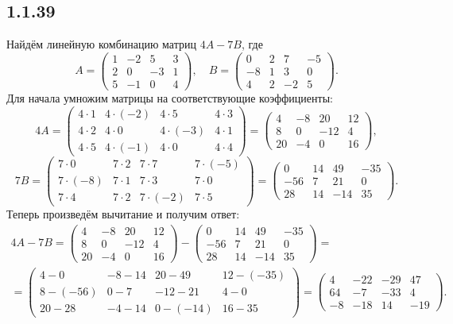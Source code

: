 \subsection{1.1.39}

Найдём линейную комбинацию матриц $4A-7B$, где
\[
A=
\begin{pmatrix}
	1 & -2 & 5 & 3 \\
	2 & 0 & -3 & 1 \\
	5 & -1 & 0 & 4
\end{pmatrix}
,\quad B=
\begin{pmatrix}
	0 & 2 & 7 & -5 \\
	-8 & 1 & 3 & 0 \\
	4 & 2 & -2 & 5
\end{pmatrix}
.
\]
Для начала умножим матрицы на соответствующие коэффициенты:
\[
4A=
\begin{pmatrix}
	4\cdot1 & 4\cdot(-2) & 4\cdot5 & 4\cdot3 \\
	4\cdot2 & 4\cdot0 & 4\cdot(-3) & 4\cdot1 \\
	4\cdot5 & 4\cdot(-1) & 4\cdot0 & 4\cdot4
\end{pmatrix}
=
\begin{pmatrix}
	4 & -8 & 20 & 12 \\
	8 & 0 & -12 & 4 \\
	20 & -4 & 0 & 16
\end{pmatrix}
,
\]
\[
7B=
\begin{pmatrix}
	7\cdot0 & 7\cdot2 & 7\cdot7 & 7\cdot(-5) \\
	7\cdot(-8) & 7\cdot1 & 7\cdot3 & 7\cdot0 \\
	7\cdot4 & 7\cdot2 & 7\cdot(-2) & 7\cdot5
\end{pmatrix}
=
\begin{pmatrix}
	0 & 14 & 49 & -35 \\
	-56 & 7 & 21 & 0 \\
	28 & 14 & -14 & 35
\end{pmatrix}
.
\]
Теперь произведём вычитание и получим ответ:
\begin{multline*}
4A-7B=
\begin{pmatrix}
	4 & -8 & 20 & 12 \\
	8 & 0 & -12 & 4 \\
	20 & -4 & 0 & 16
\end{pmatrix}
-
\begin{pmatrix}
	0 & 14 & 49 & -35 \\
	-56 & 7 & 21 & 0 \\
	28 & 14 & -14 & 35
\end{pmatrix}
= \\
=
\begin{pmatrix}
	4-0 & -8-14 & 20-49 & 12-(-35) \\
	8-(-56) & 0-7 & -12-21 & 4-0 \\
	20-28 & -4-14 & 0-(-14) & 16-35
\end{pmatrix}
=
\begin{pmatrix}
	4 & -22 & -29 & 47 \\
	64 & -7 & -33 & 4 \\
	-8 & -18 & 14 & -19
\end{pmatrix}
.
\end{multline*}